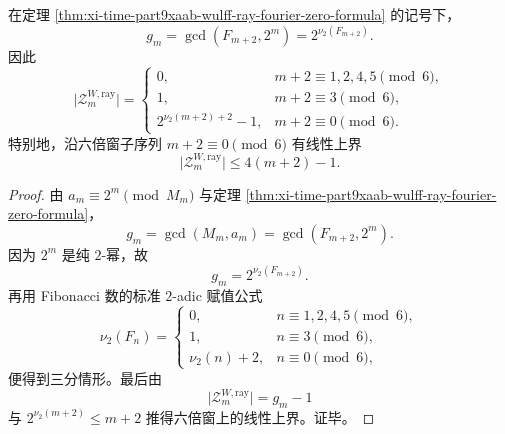 \begin{corollary}\label{cor:xi-time-part9xaab-wulff-ray-zero-2adic-phase}
在定理 \ref{thm:xi-time-part9xaab-wulff-ray-fourier-zero-formula} 的记号下，
\[
g_m=\gcd(F_{m+2},2^m)=2^{\nu_2(F_{m+2})}.
\]
因此
\[
\bigl|\mathcal Z_m^{W,\mathrm{ray}}\bigr|
=
\begin{cases}
0,
& m+2\equiv 1,2,4,5 \pmod 6,
\\[1mm]
1,
& m+2\equiv 3 \pmod 6,
\\[1mm]
2^{\nu_2(m+2)+2}-1,
& m+2\equiv 0 \pmod 6.
\end{cases}
\]
特别地，沿六倍窗子序列 \(m+2\equiv 0\pmod 6\) 有线性上界
\[
\bigl|\mathcal Z_m^{W,\mathrm{ray}}\bigr|
\le
4(m+2)-1.
\]
\end{corollary}
\begin{proof}
由 \(a_m\equiv 2^m\pmod{M_m}\) 与定理 \ref{thm:xi-time-part9xaab-wulff-ray-fourier-zero-formula}，
\[
g_m=\gcd(M_m,a_m)=\gcd(F_{m+2},2^m).
\]
因为 \(2^m\) 是纯 \(2\)-幂，故
\[
g_m=2^{\nu_2(F_{m+2})}.
\]
再用 Fibonacci 数的标准 \(2\)-adic 赋值公式
\[
\nu_2(F_n)=
\begin{cases}
0,
& n\equiv 1,2,4,5 \pmod 6,
\\
1,
& n\equiv 3 \pmod 6,
\\
\nu_2(n)+2,
& n\equiv 0 \pmod 6,
\end{cases}
\]
便得到三分情形。最后由
\[
\bigl|\mathcal Z_m^{W,\mathrm{ray}}\bigr|=g_m-1
\]
与 \(2^{\nu_2(m+2)}\le m+2\) 推得六倍窗上的线性上界。证毕。
\end{proof}

